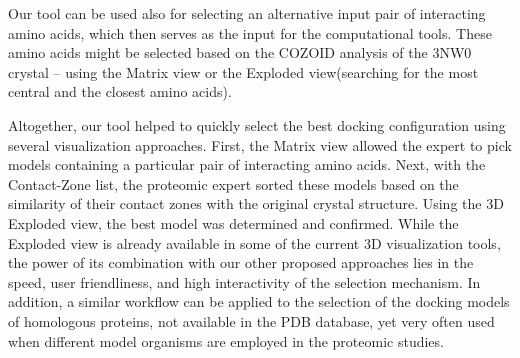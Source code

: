 \documentclass{bmcart}
\def\ExpView {Exploded view\xspace}
\def\MatView {Matrix view\xspace}
\def\CoZoList{Contact-Zone list\xspace}
\begin{document}
Our tool can be used also for selecting an alternative input pair of interacting amino acids, which then serves as the input for the computational tools.
These amino acids might be selected based on the COZOID analysis of the 3NW0 crystal -- using the \MatView or the \ExpView (searching for the most central and the closest amino acids).

Altogether, our tool helped to quickly select the best docking configuration using several visualization approaches. 
First, the \MatView allowed the expert to pick models containing a particular pair of interacting amino acids. 
Next, with the \CoZoList, the proteomic expert sorted these models based on the similarity of their contact zones with the original crystal structure. 
Using the 3D \ExpView, the best model was determined and confirmed. 
While the Exploded view is already available in some of the current 3D visualization tools, the power of its combination with our other proposed approaches lies in the speed, user friendliness, and high interactivity of the selection mechanism. 
In addition, a similar workflow can be applied to the selection of the docking models of homologous proteins, not available in the PDB database, yet very often used when different model organisms are employed in the proteomic studies.





\end{document}
